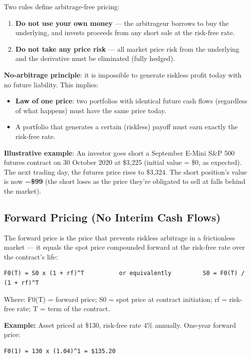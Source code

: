 \documentclass[12pt,openany]{book}
\theoremstyle{definition}
\theoremstyle{remark}
\begin{document}
Two rules define arbitrage-free pricing:
\begin{enumerate}
\item \textbf{Do not use your own money} — the arbitrageur borrows to buy the underlying, and invests proceeds from any short sale at the risk-free rate.
\item \textbf{Do not take any price risk} — all market price risk from the underlying and the derivative must be eliminated (fully hedged).
\end{enumerate}
\textbf{No-arbitrage principle}: it is impossible to generate riskless profit today with no future liability. This implies:
\begin{itemize}
\item \textbf{Law of one price}: two portfolios with identical future cash flows (regardless of what happens) must have the same price today.
\item A portfolio that generates a certain (riskless) payoff must earn exactly the risk-free rate.
\end{itemize}
\textbf{Illustrative example}: An investor goes short a September E-Mini S\&P 500 futures contract on 30 October 2020 at \$3,225 (initial value = \$0, as expected). The next trading day, the futures price rises to \$3,324. The short position's value is now \textbf{−\$99} (the short loses as the price they're obligated to sell at falls behind the market).

\subsection{Forward Pricing (No Interim Cash Flows)}

The forward price is the price that prevents riskless arbitrage in a frictionless market — it equals the spot price compounded forward at the risk-free rate over the contract's life:

\begin{lstlisting}[style=notesCode]
F0(T) = S0 x (1 + rf)^T          or equivalently         S0 = F0(T) / (1 + rf)^T
\end{lstlisting}
Where: F0(T) = forward price; S0 = spot price at contract initiation; rf = risk-free rate; T = term of the contract.

\textbf{Example:} Asset priced at \$130, risk-free rate 4\% annually. One-year forward price:
\begin{lstlisting}[style=notesCode]
F0(1) = 130 x (1.04)^1 = $135.20
\end{lstlisting}
\end{document}
